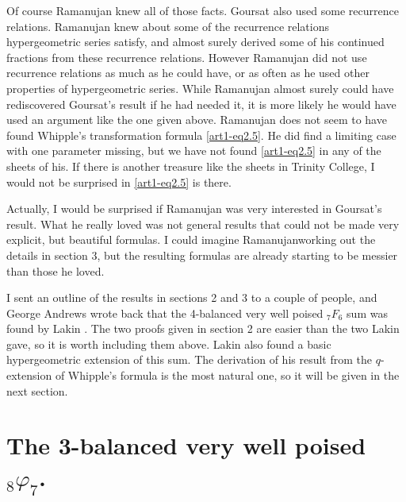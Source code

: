 Of course Ramanujan knew all of those facts. Goursat also used some recurrence relations. Ramanujan knew about some of the recurrence relations hypergeometric series satisfy, and almost surely derived some of his continued fractions from these recurrence relations. However Ramanujan did not use recurrence relations as much as he could have, or as often as he used other properties of hypergeometric series. While  Ramanujan almost surely could have rediscovered Goursat's result if he had needed it, it is more likely he would have used an argument like the one given above. Ramanujan does not seem to have found Whipple's transformation formula \eqref{art1-eq2.5}. He did find a limiting case with one parameter missing, but we have not found \eqref{art1-eq2.5} in any of the sheets of his. If there is another treasure like the sheets in Trinity College, I would not be surprised in \eqref{art1-eq2.5} is there.

Actually, I would be surprised if Ramanujan was very interested in Goursat's result. What he really loved was not general results that could not be made very explicit, but beautiful formulas. I could imagine Ramanujan\pageoriginale working out the details in section 3, but the resulting formulas are already starting to be messier than those he loved.
 
I sent an outline of the results in sections 2 and 3 to a couple of people, and George Andrews wrote back that the 4-balanced very well poised ${}_7 F_6$ sum was found by Lakin \cite{art1-key9}. The two proofs given in section 2 are easier than the two Lakin gave, so it is worth including them above. Lakin also found a basic hypergeometric extension of this sum. The derivation of his result from the $q$-extension of Whipple's formula is the most natural one, so it will be given in the next section.

\section{The 3-balanced very well poised ${}_8 \varphi_7$.}\label{art1-sec5}





\begin{thebibliography}{99}
\end{thebibliography}

